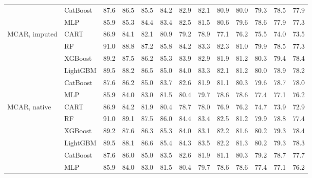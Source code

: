 \begin{table}[p]
\begin{tabular}{@{}llrrrrrrrrrrr@{}}
 & CatBoost & 87.6 & 86.5 & 85.5 & 84.2 & 82.9 & 82.1 & 80.9 & 80.0 & 79.3 & 78.5 & 77.9 \\
 & MLP & 85.9 & 85.3 & 84.4 & 83.4 & 82.5 & 81.5 & 80.6 & 79.6 & 78.6 & 77.9 & 77.3 \\
\midrule
MCAR, imputed & CART & 86.9 & 84.1 & 82.1 & 80.9 & 79.2 & 78.9 & 77.1 & 76.2 & 75.5 & 74.0 & 73.5 \\
 & RF & 91.0 & 88.8 & 87.2 & 85.8 & 84.2 & 83.3 & 82.3 & 81.0 & 79.9 & 78.5 & 77.3 \\
 & XGBoost & 89.2 & 87.5 & 86.2 & 85.3 & 83.9 & 82.9 & 81.9 & 81.2 & 80.3 & 79.4 & 78.4 \\
 & LightGBM & 89.5 & 88.2 & 86.5 & 85.0 & 84.0 & 83.3 & 82.1 & 81.2 & 80.0 & 78.9 & 78.2 \\
 & CatBoost & 87.6 & 86.2 & 85.0 & 83.7 & 82.6 & 81.9 & 81.1 & 80.3 & 79.6 & 78.7 & 78.0 \\
 & MLP & 85.9 & 84.0 & 83.0 & 81.5 & 80.4 & 79.7 & 78.6 & 78.6 & 77.4 & 77.1 & 76.2 \\
\midrule
MCAR, native & CART & 86.9 & 84.2 & 81.9 & 80.4 & 78.7 & 78.0 & 76.9 & 76.2 & 74.7 & 73.9 & 72.9 \\
 & RF & 91.0 & 89.1 & 87.5 & 86.0 & 84.4 & 83.4 & 82.5 & 81.2 & 79.9 & 78.8 & 77.4 \\
 & XGBoost & 89.2 & 87.6 & 86.3 & 85.3 & 84.0 & 83.1 & 82.2 & 81.6 & 80.2 & 79.3 & 78.4 \\
 & LightGBM & 89.5 & 88.1 & 86.6 & 85.4 & 84.3 & 83.5 & 82.2 & 81.3 & 80.2 & 79.3 & 78.3 \\
 & CatBoost & 87.6 & 86.0 & 85.0 & 83.5 & 82.6 & 81.9 & 81.1 & 80.3 & 79.2 & 78.7 & 77.7 \\
 & MLP & 85.9 & 84.0 & 83.0 & 81.5 & 80.4 & 79.7 & 78.6 & 78.6 & 77.4 & 77.1 & 76.2 \\
\bottomrule
\end{tabular}
\end{table}

